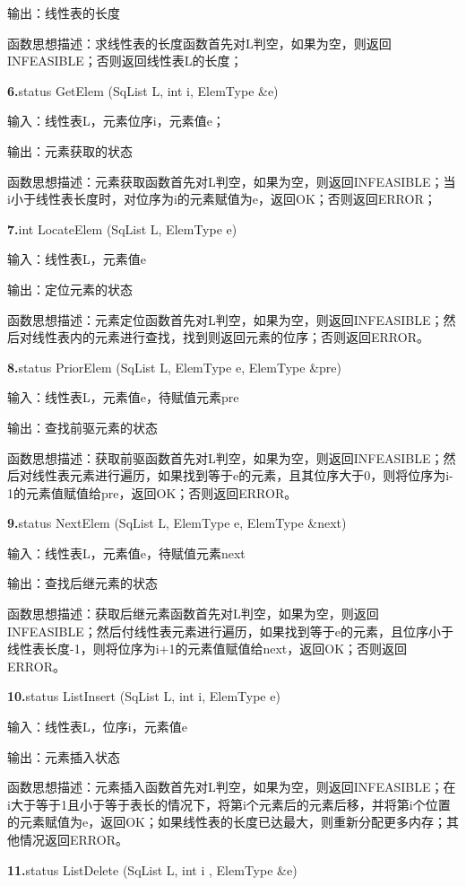 \documentclass[supercite]{Experimental_Report}
\theoremstyle{definition}
\begin{document}
输出：线性表的长度

函数思想描述：求线性表的长度函数首先对L判空，如果为空，则返回INFEASIBLE；否则返回线性表L的长度；

\noindent\textbf{ 6.}status GetElem (SqList L, int i, ElemType \&e)

输入：线性表L，元素位序i，元素值e；

输出：元素获取的状态

函数思想描述：元素获取函数首先对L判空，如果为空，则返回INFEASIBLE；当i小于线性表长度时，对位序为i的元素赋值为e，返回OK；否则返回ERROR；

\noindent\textbf{ 7.}int LocateElem (SqList L, ElemType e)

输入：线性表L，元素值e

输出：定位元素的状态

函数思想描述：元素定位函数首先对L判空，如果为空，则返回INFEASIBLE；然后对线性表内的元素进行查找，找到则返回元素的位序；否则返回ERROR。

\noindent\textbf{ 8.}status PriorElem (SqList L, ElemType e, ElemType \&pre)

输入：线性表L，元素值e，待赋值元素pre

输出：查找前驱元素的状态

函数思想描述：获取前驱函数首先对L判空，如果为空，则返回INFEASIBLE；然后对线性表元素进行遍历，如果找到等于e的元素，且其位序大于0，则将位序为i-1的元素值赋值给pre，返回OK；否则返回ERROR。

\noindent\textbf{ 9.}status NextElem (SqList L, ElemType e, ElemType \&next)

输入：线性表L，元素值e，待赋值元素next

输出：查找后继元素的状态

函数思想描述：获取后继元素函数首先对L判空，如果为空，则返回INFEASIBLE；然后付线性表元素进行遍历，如果找到等于e的元素，且位序小于线性表长度-1，则将位序为i+1的元素值赋值给next，返回OK；否则返回ERROR。

\noindent\textbf{10.}status ListInsert (SqList L, int i, ElemType e)

输入：线性表L，位序i，元素值e

输出：元素插入状态

函数思想描述：元素插入函数首先对L判空，如果为空，则返回INFEASIBLE；在i大于等于1且小于等于表长的情况下，将第i个元素后的元素后移，并将第i个位置的元素赋值为e，返回OK；如果线性表的长度已达最大，则重新分配更多内存；其他情况返回ERROR。

\noindent\textbf{11.}status ListDelete (SqList L, int i , ElemType \&e)
\end{document}
